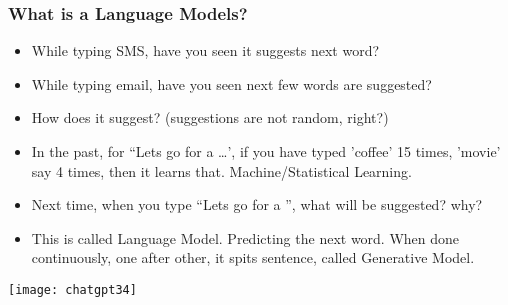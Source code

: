 




\begin{frame}[fragile]\frametitle{What is a Language Models?}

\begin{itemize}
\item While typing SMS, have you seen it suggests next word?
\item While typing email, have you seen next few words are suggested?
\item How does it suggest? (suggestions are not random, right?)
\item In the past, for ``Lets go for a \ldots', if you have typed 'coffee' 15 times, 'movie' say 4 times, then it learns that. Machine/Statistical Learning.
\item Next time, when you type ``Lets go for a '', what will be suggested? why?
\item This is called Language Model. Predicting the next word. When done continuously, one after other, it spits sentence, called Generative Model.
\end{itemize}	

\begin{center}
\texttt{[image: chatgpt34]}
\end{center}		

\end{frame}

